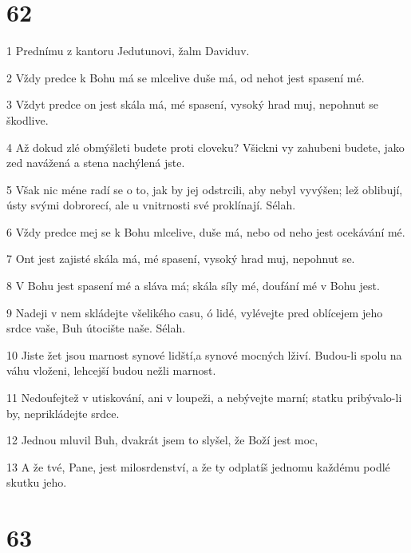 \chapter{62}

\par 1 Prednímu z kantoru Jedutunovi, žalm Daviduv.
\par 2 Vždy predce k Bohu má se mlcelive duše má, od nehot jest spasení mé.
\par 3 Vždyt predce on jest skála má, mé spasení, vysoký hrad muj, nepohnut se škodlive.
\par 4 Až dokud zlé obmýšleti budete proti cloveku? Všickni vy zahubeni budete, jako zed navážená a stena nachýlená jste.
\par 5 Však nic méne radí se o to, jak by jej odstrcili, aby nebyl vyvýšen; lež oblibují, ústy svými dobrorecí, ale u vnitrnosti své proklínají. Sélah.
\par 6 Vždy predce mej se k Bohu mlcelive, duše má, nebo od neho jest ocekávání mé.
\par 7 Ont jest zajisté skála má, mé spasení, vysoký hrad muj, nepohnut se.
\par 8 V Bohu jest spasení mé a sláva má; skála síly mé, doufání mé v Bohu jest.
\par 9 Nadeji v nem skládejte všelikého casu, ó lidé, vylévejte pred oblícejem jeho srdce vaše, Buh útocište naše. Sélah.
\par 10 Jiste žet jsou marnost synové lidští,a synové mocných lživí. Budou-li spolu na váhu vloženi, lehcejší budou nežli marnost.
\par 11 Nedoufejtež v utiskování, ani v loupeži, a nebývejte marní; statku pribývalo-li by, neprikládejte srdce.
\par 12 Jednou mluvil Buh, dvakrát jsem to slyšel, že Boží jest moc,
\par 13 A že tvé, Pane, jest milosrdenství, a že ty odplatíš jednomu každému podlé skutku jeho.

\chapter{63}

